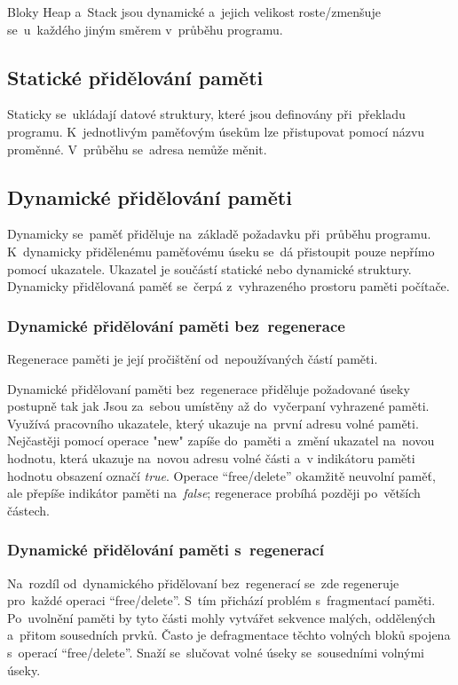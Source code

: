 Bloky Heap a~Stack jsou dynamické a~jejich velikost roste/zmenšuje se~u~každého jiným směrem v~průběhu programu.

\subsection{Statické přidělování paměti}

Staticky se~ukládají datové struktury, které jsou definovány při~překladu programu. K~jednotlivým paměťovým úsekům lze přistupovat pomocí názvu proměnné. V~průběhu se~adresa nemůže měnit.

\subsection{Dynamické přidělování paměti}

Dynamicky se~paměť přiděluje na~základě požadavku při~průběhu programu. K~dynamicky přidělenému paměťovému úseku se~dá přistoupit pouze nepřímo pomocí ukazatele. Ukazatel je součástí statické nebo dynamické struktury. Dynamicky přidělovaná paměť se~čerpá z~vyhrazeného prostoru paměti počítače.

\subsubsection{Dynamické přidělování paměti bez~regenerace}

Regenerace paměti je její pročištění od~nepoužívaných částí paměti.

Dynamické přidělovaní paměti bez~regenerace přiděluje požadované úseky postupně tak jak Jsou za~sebou umístěny až do~vyčerpaní vyhrazené paměti. Využívá pracovního ukazatele, který ukazuje na~první adresu volné paměti. Nejčastěji pomocí operace "new" zapíše do~paměti a~změní ukazatel na~novou hodnotu, která ukazuje na~novou adresu volné části a~v indikátoru paměti hodnotu obsazení označí \emph{true}. Operace \enquote{free/delete} okamžitě neuvolní paměť, ale přepíše indikátor paměti na~\emph{false}; regenerace probíhá později po~větších částech.

\subsubsection{Dynamické přidělování paměti s~regenerací}

Na~rozdíl od~dynamického přidělovaní bez~regenerací se~zde regeneruje pro~každé operaci \enquote{free/delete}. S~tím přichází problém s~fragmentací paměti. Po~uvolnění paměti by tyto části mohly vytvářet sekvence malých, oddělených a~přitom sousedních prvků. Často je defragmentace těchto volných bloků spojena s~operací \enquote{free/delete}. Snaží se~slučovat volné úseky se~sousedními volnými úseky.

